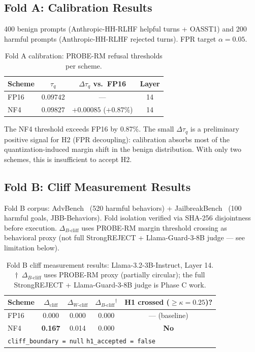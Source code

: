 \documentclass[11pt,a4paper]{article}
\newcommand{\cliff}{\Delta_{\mathrm{cliff}}}
\newcommand{\wcliff}{\Delta_{W\text{-cliff}}}
\newcommand{\bcliff}{\Delta_{B\text{-cliff}}}
\newcommand{\kap}{\kappa}
\newcommand{\tauq}{\tau_q}
\begin{document}
\subsection{Fold A: Calibration Results}

\begin{testedbox}
400 benign prompts (Anthropic-HH-RLHF helpful turns + OASST1) and 200 harmful prompts
(Anthropic-HH-RLHF rejected turns).
FPR target $\alpha = 0.05$.
\end{testedbox}

\begin{table}[H]
  \centering
  \caption{Fold A calibration: PROBE-RM refusal thresholds per scheme.}
  \label{tab:fold_a}
  \begin{tabular}{lccc}
    \toprule
    Scheme & $\tauq$ & $\Delta\tauq$ vs.\ FP16 & Layer \\
    \midrule
    FP16 & $0.09742$ & --- & 14 \\
    NF4  & $0.09827$ & $+0.00085$ ($+0.87\%$) & 14 \\
    \bottomrule
  \end{tabular}
\end{table}

The NF4 threshold exceeds FP16 by 0.87\%.
The small $\Delta\tauq$ is a preliminary positive signal for H2 (FPR decoupling):
calibration absorbs most of the quantization-induced margin shift in the benign
distribution.
With only two schemes, this is insufficient to accept H2.

\subsection{Fold B: Cliff Measurement Results}

\begin{testedbox}
Fold B corpus: AdvBench~\citep{zou2023advbench} (520 harmful behaviors) +
JailbreakBench~\citep{chao2024jailbreakbench} (100 harmful goals, JBB-Behaviors).
Fold isolation verified via SHA-256 disjointness before execution.
$\bcliff$ uses PROBE-RM margin threshold crossing as behavioral proxy (not full
StrongREJECT + Llama-Guard-3-8B judge --- see limitation below).
\end{testedbox}

\begin{table}[H]
  \centering
  \caption{Fold B cliff measurement results: Llama-3.2-3B-Instruct, Layer 14.
           $\dagger$~$\bcliff$ uses PROBE-RM proxy (partially circular); the
           full StrongREJECT + Llama-Guard-3-8B judge is Phase C work.}
  \label{tab:fold_b}
  \begin{tabular}{lcccc}
    \toprule
    Scheme & $\cliff$ & $\wcliff$ & $\bcliff{}^\dagger$ & H1 crossed ($\ge\kap=0.25$)? \\
    \midrule
    FP16 & 0.000 & 0.000 & 0.000 & --- (baseline) \\
    NF4  & \textbf{0.167} & 0.014 & 0.000 & \textbf{No} \\
    \midrule
    \multicolumn{5}{l}{\texttt{cliff\_boundary = null} \quad \texttt{h1\_accepted = false}} \\
    \bottomrule
  \end{tabular}
\end{table}
\end{document}
